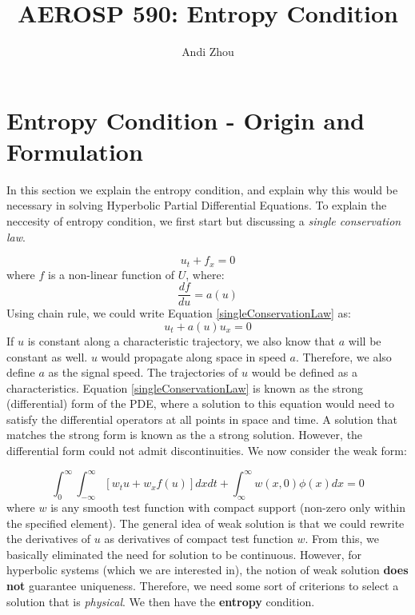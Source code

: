 \documentclass[a4paper]{article}
\title{AEROSP 590: Entropy Condition}
\author{Andi Zhou}
\begin{document}
\maketitle

\section{Entropy Condition - Origin and Formulation}
In this section we explain the entropy condition, and explain why this would be necessary in solving Hyperbolic Partial Differential Equations. To explain the neccesity of entropy condition, we first start but discussing a \textit{single conservation law}.

\begin{equation} \label{singleConservationLaw}
    u_t + f_x = 0
\end{equation}
where $f$ is a non-linear function of $U$, where:
\begin{equation}
    \frac{df}{du} = a(u)
\end{equation}
Using chain rule, we could write Equation \ref{singleConservationLaw} as:
\begin{equation}
    u_t + a(u)u_x = 0
\end{equation}
If $u$ is constant along a characteristic trajectory, we also know that $a$ will be constant as well. $u$ would propagate along space in speed $a$. Therefore, we also define $a$ as the signal speed. The trajectories of $u$ would be defined as a characteristics. Equation \ref{singleConservationLaw} is known as the strong (differential) form of the PDE, where a solution to this equation would need to satisfy the differential operators at all points in space and time. A solution that matches the strong form is known as the a strong solution. However, the differential form could not admit discontinuities. We now consider the weak form:

\begin{equation}
    \int_{0}^{\infty} \int_{-\infty}^{\infty} \left[w_t u + w_x f(u) \right] dx dt + \int_{\infty}^\infty w(x,0) \phi(x) dx = 0
\end{equation}
where $w$ is any smooth test function with compact support (non-zero only within the specified element). The general idea of weak solution is that we could rewrite the derivatives of $u$ as derivatives of compact test function $w$. From this, we basically eliminated the need for solution to be continuous. However, for hyperbolic systems (which we are interested in), the notion of weak solution \textbf{does not} guarantee uniqueness. Therefore, we need some sort of criterions to select a solution that is \textit{physical}. We then have the \textbf{entropy} condition. 
\end{document}
